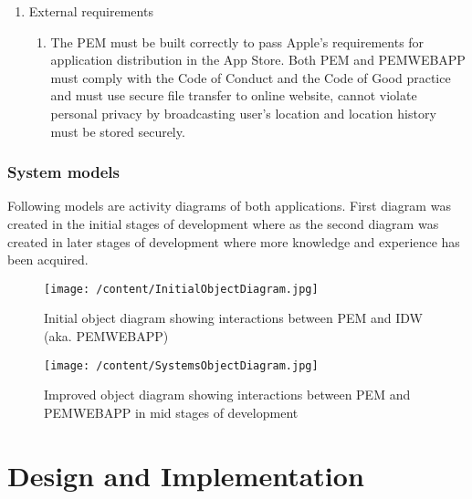 \documentclass[12pt, a4paper]{report}   %
\begin{document}
\begin{enumerate}
\begin{enumerate}
		\item External requirements
		\begin{enumerate}
			\item The PEM must be built correctly to pass Apple's requirements for application distribution in the App Store. Both PEM and PEMWEBAPP must comply with the Code of Conduct and the Code of Good practice and must use secure file transfer to online website, cannot violate personal privacy by broadcasting user's location and location history must be stored securely.
		\end{enumerate}
	\end{enumerate}
	

\subsection{System models}
Following models are activity diagrams of both applications. First diagram was created in the initial stages of development where as the second diagram was created in later stages of development where more knowledge and experience has been acquired.


\begin{figure}[H]
  \centering
	\texttt{[image: /content/InitialObjectDiagram.jpg]}
	  \caption{Initial object diagram showing interactions between PEM and IDW (aka. PEMWEBAPP)}
\end{figure}


 \begin{figure}[H]
 \begin{sideways}
 \begin{minipage}{19cm}
	\texttt{[image: /content/SystemsObjectDiagram.jpg]}
	  \caption{Improved object diagram showing interactions between PEM and PEMWEBAPP in mid stages of development}
 \end{minipage}
 \end{sideways}
 \centering
 \end{figure}


\chapter{Design and Implementation}

\end{enumerate}
\end{document}

